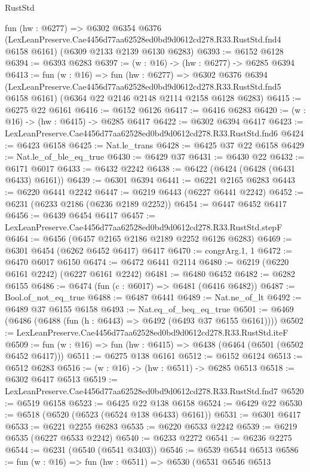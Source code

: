 \begin{lexlean}{RustStd}
\begin{coremodule}
  fun (hw : @6277) =>
  @6302
    @6354
    @6376
    (LexLeanPreserve.Cae4456d77aa62528ed0bd9d0612cd278.R33.RustStd.fnd4 @6158 @6161)
    (@6309 @2133 @2139 @6130 @6283)
@6393 := @6152 @6128
@6394 := @6393 @6283
@6397 := (w : @16) -> (hw : @6277) -> @6285 @6394
@6413 := fun (w : @16) =>
  fun (hw : @6277) =>
  @6302
    @6376
    @6394
    (LexLeanPreserve.Cae4456d77aa62528ed0bd9d0612cd278.R33.RustStd.fnd5 @6158 @6161)
    (@6364 @22 @2146 @2148 @2114 @2158 @6128 @6283)
@6415 := @6275 @22 @6161
@6416 := @6152 @6126
@6417 := @6416 @6283
@6420 := (w : @16) -> (hw : @6415) -> @6285 @6417
@6422 := @6302 @6394 @6417
@6423 := LexLeanPreserve.Cae4456d77aa62528ed0bd9d0612cd278.R33.RustStd.fnd6
@6424 := @6423 @6158
@6425 := Nat.le_trans
@6428 := @6425 @37 @22 @6158
@6429 := Nat.le_of_ble_eq_true
@6430 := @6429 @37
@6431 := @6430 @22
@6432 := @6171 @6017
@6433 := @6432 @2242
@6438 := @6422 (@6424 (@6428 (@6431 @6433) @6161))
@6439 := @6301 @6394
@6441 := @6221 @2165 @6283
@6443 := @6220 @6441 @2242
@6447 := @6219 @6443 (@6227 @6441 @2242)
@6452 := @6231 (@6233 @2186 (@6236 @2189 @2252))
@6454 := @6447 @6452 @6417
@6456 := @6439 @6454 @6417
@6457 := LexLeanPreserve.Cae4456d77aa62528ed0bd9d0612cd278.R33.RustStd.stepF
@6464 := @6456 (@6457 @2165 @2186 @2189 @2252 @6126 @6283)
@6469 := @6301 @6454 (@6262 @6452 @6417) @6417
@6470 := congrArg.{1, 1}
@6472 := @6470 @6017 @6150
@6474 := @6472 @6441 @2114
@6480 := @6219 (@6220 @6161 @2242) (@6227 @6161 @2242)
@6481 := @6480 @6452
@6482 := @6282 @6155
@6486 := @6474 (fun (c : @6017) => @6481 (@6416 @6482))
@6487 := Bool.of_not_eq_true
@6488 := @6487 @6441
@6489 := Nat.ne_of_lt
@6492 := @6489 @37 @6155 @6158
@6493 := Nat.eq_of_beq_eq_true
@6501 := @6469 (@6486 (@6488 (fun (h : @6443) => @6492 (@6493 @37 @6155 @6161))))
@6502 := LexLeanPreserve.Cae4456d77aa62528ed0bd9d0612cd278.R33.RustStd.iteF
@6509 := fun (w : @16) => fun (hw : @6415) => @6438 (@6464 (@6501 (@6502 @6452 @6417)))
@6511 := @6275 @138 @6161
@6512 := @6152 @6124
@6513 := @6512 @6283
@6516 := (w : @16) -> (hw : @6511) -> @6285 @6513
@6518 := @6302 @6417 @6513
@6519 := LexLeanPreserve.Cae4456d77aa62528ed0bd9d0612cd278.R33.RustStd.fnd7
@6520 := @6519 @6158
@6523 := @6425 @22 @138 @6158
@6524 := @6429 @22
@6530 := @6518 (@6520 (@6523 (@6524 @138 @6433) @6161))
@6531 := @6301 @6417
@6533 := @6221 @2255 @6283
@6535 := @6220 @6533 @2242
@6539 := @6219 @6535 (@6227 @6533 @2242)
@6540 := @6233 @2272
@6541 := @6236 @2275
@6544 := @6231 (@6540 (@6541 @3403))
@6546 := @6539 @6544 @6513
@6586 := fun (w : @16) =>
  fun (hw : @6511) =>
  @6530
    (@6531
      @6546
      @6513

\end{coremodule}
\end{lexlean}
